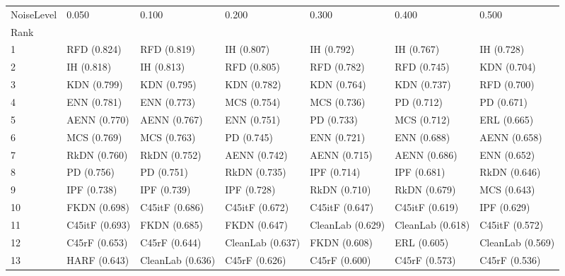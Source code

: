 \begin{tabular}{lllllll}
\toprule
NoiseLevel &             0.050 &             0.100 &             0.200 &             0.300 &             0.400 &             0.500 \\
Rank &                   &                   &                   &                   &                   &                   \\
\midrule
1    &       RFD (0.824) &       RFD (0.819) &        IH (0.807) &        IH (0.792) &        IH (0.767) &        IH (0.728) \\
2    &        IH (0.818) &        IH (0.813) &       RFD (0.805) &       RFD (0.782) &       RFD (0.745) &       KDN (0.704) \\
3    &       KDN (0.799) &       KDN (0.795) &       KDN (0.782) &       KDN (0.764) &       KDN (0.737) &       RFD (0.700) \\
4    &       ENN (0.781) &       ENN (0.773) &       MCS (0.754) &       MCS (0.736) &        PD (0.712) &        PD (0.671) \\
5    &      AENN (0.770) &      AENN (0.767) &       ENN (0.751) &        PD (0.733) &       MCS (0.712) &       ERL (0.665) \\
6    &       MCS (0.769) &       MCS (0.763) &        PD (0.745) &       ENN (0.721) &       ENN (0.688) &      AENN (0.658) \\
7    &      RkDN (0.760) &      RkDN (0.752) &      AENN (0.742) &      AENN (0.715) &      AENN (0.686) &       ENN (0.652) \\
8    &        PD (0.756) &        PD (0.751) &      RkDN (0.735) &       IPF (0.714) &       IPF (0.681) &      RkDN (0.646) \\
9    &       IPF (0.738) &       IPF (0.739) &       IPF (0.728) &      RkDN (0.710) &      RkDN (0.679) &       MCS (0.643) \\
10   &      FKDN (0.698) &    C45itF (0.686) &    C45itF (0.672) &    C45itF (0.647) &    C45itF (0.619) &       IPF (0.629) \\
11   &    C45itF (0.693) &      FKDN (0.685) &      FKDN (0.647) &  CleanLab (0.629) &  CleanLab (0.618) &    C45itF (0.572) \\
12   &     C45rF (0.653) &     C45rF (0.644) &  CleanLab (0.637) &      FKDN (0.608) &       ERL (0.605) &  CleanLab (0.569) \\
13   &      HARF (0.643) &  CleanLab (0.636) &     C45rF (0.626) &     C45rF (0.600) &     C45rF (0.573) &     C45rF (0.536) \\

\end{tabular}
